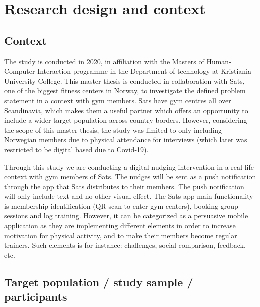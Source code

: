 
\section{Research design and context}
\subsection{Context  }

The study is conducted in 2020, in affiliation with the Masters of Human-Computer Interaction programme in the Department of technology at Kristiania University College. This master thesis is conducted in collaboration with Sats, one of the biggest fitness centers in Norway, to investigate the defined problem statement in a context with gym members. Sats have gym centres all over Scandinavia, which makes them a useful partner which offers an opportunity to include a wider target population across country borders. However, considering the scope of this master thesis, the study was limited to only including Norwegian members due to physical attendance for interviews (which later was restricted to be digital based due to Covid-19). 

Through this study we are conducting a digital nudging intervention in a real-life context with gym members of Sats. The nudges will be sent as a push notification through the app that Sats distributes to their members. The push notification will only include text and no other visual effect. The Sats app main functionality is membership identification (QR scan to enter gym centers), booking group sessions and log training. However, it can be categorized as a persuasive mobile application as they are implementing different elements in order to increase motivation for physical activity, and to make their members become regular trainers. Such elements is for instance: challenges, social comparison, feedback, etc. 

\subsection{Target population / study sample / participants}

